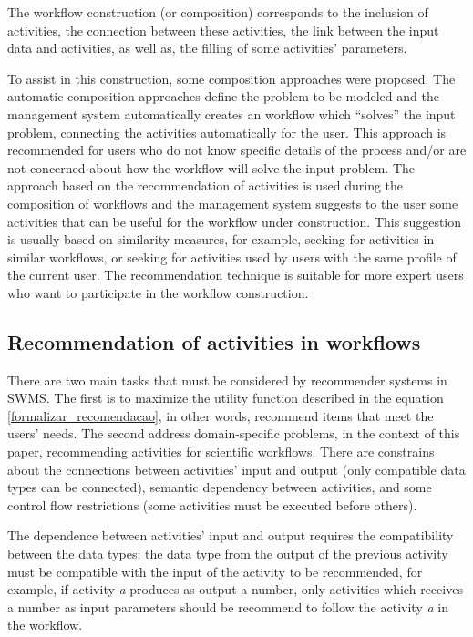 \documentclass{sig-alternate-05-2015}
\begin{document}
The workflow construction (or composition) corresponds to the inclusion of activities, the connection between these activities, the link between the input data and activities, as well as, the filling of some activities' parameters.

To assist in this construction, some composition approaches were proposed. The automatic composition approaches define the problem to be modeled and the management system automatically creates an workflow which ``solves'' the input problem, connecting the activities automatically for the user. This approach is recommended for users who do not know specific details of the process and/or are not concerned about how the workflow will solve the input problem. The approach based on the recommendation of activities is used during the composition of workflows and the management system suggests to the user some activities that can be useful for the workflow under construction. This suggestion is usually based on similarity measures, for example, seeking for activities in similar workflows, or seeking for activities used by users with the same profile of the current user. The recommendation technique is suitable for more expert users who want to participate in the workflow construction.

\subsection{Recommendation of activities in workflows}\label{RECOMENDACAO_WORKFLOWS_CIENTIFICOS}
There are two main tasks that must be considered by recommender systems in SWMS. 
The first is to maximize the utility function described in the equation \eqref{formalizar_recomendacao}, in other words, recommend items that meet the users' needs. The second address domain-specific problems, in the context of this paper, recommending activities for scientific workflows. There are constrains about the connections between activities' input and output (only compatible data types can be connected), semantic dependency between activities, and some control flow restrictions (some activities must be executed before others).

The dependence between activities' input and output requires the compatibility between the data types: the data type from the output of the previous activity must be compatible with the input of the activity to be recommended, for example, if  activity \emph{a} produces as output a number, only activities which receives a number as input parameters should be recommend to follow the activity \emph{a} in the workflow.
\end{document}
